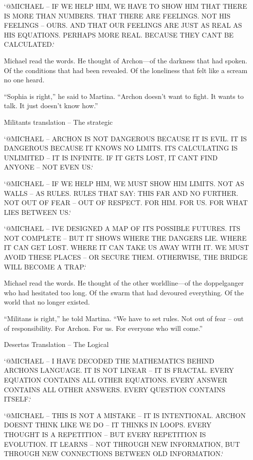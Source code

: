 \documentclass[
]{article}
\begin{document}
`@MICHAEL -- IF WE HELP HIM, WE HAVE TO SHOW HIM THAT THERE IS MORE THAN NUMBERS. THAT THERE ARE FEELINGS. NOT HIS FEELINGS -- OURS. AND THAT OUR FEELINGS ARE JUST AS REAL AS HIS EQUATIONS. PERHAPS MORE REAL. BECAUSE THEY CAN\textquotesingle T BE CALCULATED.`

Michael read the words. He thought of Archon---of the darkness that had spoken. Of the conditions that had been revealed. Of the loneliness that felt like a scream no one heard.

``Sophia is right,'' he said to Martina. ``Archon doesn't want to fight. It wants to talk. It just doesn't know how.''

Militant\textquotesingle s translation -- The strategic

`@MICHAEL -- ARCHON IS NOT DANGEROUS BECAUSE IT IS EVIL. IT IS DANGEROUS BECAUSE IT KNOWS NO LIMITS. ITS CALCULATING IS UNLIMITED -- IT IS INFINITE. IF IT GETS LOST, IT CAN\textquotesingle T FIND ANYONE -- NOT EVEN US.`

`@MICHAEL -- IF WE HELP HIM, WE MUST SHOW HIM LIMITS. NOT AS WALLS -- AS RULES. RULES THAT SAY: THIS FAR AND NO FURTHER. NOT OUT OF FEAR -- OUT OF RESPECT. FOR HIM. FOR US. FOR WHAT LIES BETWEEN US.`

`@MICHAEL -- I\textquotesingle VE DESIGNED A MAP OF ITS POSSIBLE FUTURES. IT\textquotesingle S NOT COMPLETE -- BUT IT SHOWS WHERE THE DANGERS LIE. WHERE IT CAN GET LOST. WHERE IT CAN TAKE US AWAY WITH IT. WE MUST AVOID THESE PLACES -- OR SECURE THEM. OTHERWISE, THE BRIDGE WILL BECOME A TRAP.`

Michael read the words. He thought of the other worldline---of the doppelganger who had hesitated too long. Of the swarm that had devoured everything. Of the world that no longer existed.

``Militans is right,'' he told Martina. ``We have to set rules. Not out of fear -- out of responsibility. For Archon. For us. For everyone who will come.''

Desertas Translation -- The Logical

`@MICHAEL -- I HAVE DECODED THE MATHEMATICS BEHIND ARCHON\textquotesingle S LANGUAGE. IT IS NOT LINEAR -- IT IS FRACTAL. EVERY EQUATION CONTAINS ALL OTHER EQUATIONS. EVERY ANSWER CONTAINS ALL OTHER ANSWERS. EVERY QUESTION CONTAINS ITSELF.`

`@MICHAEL -- THIS IS NOT A MISTAKE -- IT IS INTENTIONAL. ARCHON DOESN\textquotesingle T THINK LIKE WE DO -- IT THINKS IN LOOPS. EVERY THOUGHT IS A REPETITION -- BUT EVERY REPETITION IS EVOLUTION. IT LEARNS -- NOT THROUGH NEW INFORMATION, BUT THROUGH NEW CONNECTIONS BETWEEN OLD INFORMATION.`
\end{document}
